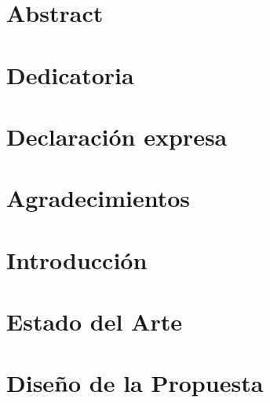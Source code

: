 \documentclass[12pt,twoside]{report}
\begin{document}
    
        
    
        
        \chapter*{Abstract}
        
        
        \chapter*{Dedicatoria}
        
        
        \chapter*{Declaración expresa}
        
        
        \chapter*{Agradecimientos}
        
        
        \tableofcontents
        
        \listoffigures
         
        \listoftables
        
        \chapter{Introducción}
        
        \chapter{Estado del Arte}
        
        \chapter{Diseño de la Propuesta}
        
        
        

        
        
    
    
\end{document}
